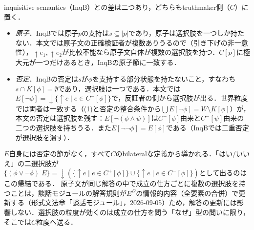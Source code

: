 \documentclass[../../main-detail.tex]{subfiles}
\begin{document}
\begin{remark}[原子と否定での違い]
    inquisitive semantics（InqB）との差は二つあり，どちらもtruthmaker側（$C$）に置く．
    \begin{itemize}
        \item \emph{原子}．InqBでは原子$p$の支持は$s \subseteq |p|$であり，原子は選択肢を一つしか持たない．本文では原子文の正確検証者が複数ありうるので（引き下げの非一意性），$\uparrow e_1, \uparrow e_2$が比較不能なら原子文自体が複数の選択肢を持つ．$C[p]$に極大元が一つだけあるとき，InqBの原子節に一致する．
        \item \emph{否定}．InqBの否定は$s$が$\phi$を支持する部分状態を持たないこと，すなわち$s \cap K[\phi] = \emptyset$であり，選択肢は一つである．本文では$E[\lnot\phi] = {\downarrow}\{\uparrow e \mid e \in C^-[\phi]\}$で，反証者の側から選択肢が出る．世界粒度では両者は一致する（(1)と否定の整合条件から$\bigcup E[\lnot\phi] = W \setminus K[\phi]$）が，本文の否定は選択肢を残す：$E[\lnot(\phi\land\psi)]$は$C^-[\phi]$由来と$C^-[\psi]$由来の二つの選択肢を持ちうる．また$E[\lnot\lnot\phi] = E[\phi]$である（InqBでは二重否定が選択肢を潰す）．
    \end{itemize}
    $E$自身には否定の節がなく，すべて$C$のbilateralな定義から導かれる．「はい/いいえ」の二選択肢が$\{(\phi\lor\lnot\phi)\; E\} = {\downarrow}(\{\uparrow e \mid e\in C^+[\phi]\}\cup\{\uparrow e \mid e \in C^-[\phi]\})$として出るのはこの帰結である．
    原子文が同じ解答の中で成立の仕方ごとに複数の選択肢を持つことは，談話モジュールの解答規則が$E^D$の情報的内容（全要素の合併）で更新する（形式文法章「談話モジュール」，2026-09-05）ため，解答の更新には影響しない．選択肢の粒度が効くのは成立の仕方を問う「なぜ」型の問いに限り，そこでは$C$粒度へ送る．
\end{remark}
\end{document}
